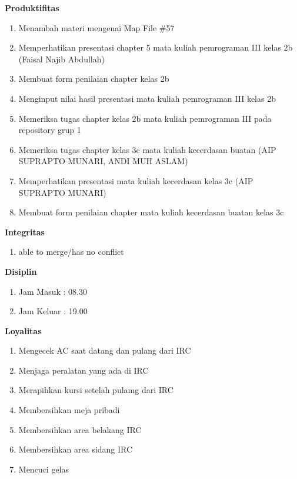 \begin{enumerate}
\textbf{Produktifitas}
\begin{enumerate}
\item Menambah materi mengenai Map File \#57
\item Memperhatikan presentasi chapter 5 mata kuliah pemrograman III kelas 2b (Faisal Najib Abdullah)
\item Membuat form penilaian chapter kelas 2b
\item Menginput nilai hasil presentasi mata kuliah pemrograman III kelas 2b
\item Memeriksa tugas chapter kelas 2b mata kuliah pemrograman III pada repository grup 1
\item Memeriksa tugas chapter kelas 3c mata kuliah kecerdasan buatan (AIP SUPRAPTO MUNARI, ANDI MUH ASLAM)
\item Memperhatikan presentasi mata kuliah kecerdasan kelas 3c (AIP SUPRAPTO MUNARI)
\item Membuat form penilaian chapter mata kuliah kecerdasan buatan kelas 3c 
\end{enumerate}

\textbf{Integritas}
\begin{enumerate}
\item able to merge/has no conflict
\end{enumerate}

\textbf{Disiplin}
\begin{enumerate}
\item Jam Masuk : 08.30
\item Jam Keluar : 19.00
\end{enumerate}

\textbf{Loyalitas}
\begin{enumerate}
\item Mengecek AC saat datang dan pulang dari IRC
\item Menjaga peralatan yang ada di IRC
\item Merapihkan kursi setelah pulamg dari IRC
\item Membersihkan meja pribadi
\item Membersihkan area belakang IRC
\item Membersihkan area sidang IRC
\item Mencuci gelas
\end{enumerate}




\end{enumerate}
